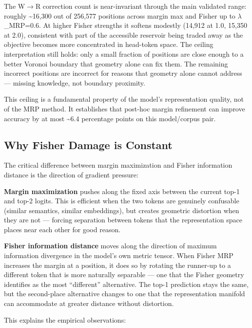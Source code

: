 \documentclass[
  11pt,
]{article}
\begin{document}
The W$\rightarrow$R correction count is near-invariant through the main validated
range: roughly \textasciitilde16,300 out of 256,577 positions across
margin max and Fisher up to $\lambda$\_MRP=0.6. At higher Fisher strengths it
softens modestly (14,912 at 1.0, 15,350 at 2.0), consistent with part of
the accessible reservoir being traded away as the objective becomes more
concentrated in head-token space. The ceiling interpretation still
holds: only a small fraction of positions are close enough to a better
Voronoi boundary that geometry alone can fix them. The remaining
incorrect positions are incorrect for reasons that geometry alone cannot
address --- missing knowledge, not boundary proximity.

This ceiling is a fundamental property of the model's representation
quality, not of the MRP method. It establishes that post-hoc margin
refinement can improve accuracy by at most \textasciitilde6.4 percentage
points on this model/corpus pair.

\hypertarget{why-fisher-damage-is-constant}{%
\subsection{Why Fisher Damage is
Constant}\label{why-fisher-damage-is-constant}}

The critical difference between margin maximization and Fisher
information distance is the direction of gradient pressure:

\textbf{Margin maximization} pushes along the fixed axis between the
current top-1 and top-2 logits. This is efficient when the two tokens
are genuinely confusable (similar semantics, similar embeddings), but
creates geometric distortion when they are not --- forcing separation
between tokens that the representation space places near each other for
good reason.

\textbf{Fisher information distance} moves along the direction of
maximum information divergence in the model's own metric tensor. When
Fisher MRP increases the margin at a position, it does so by rotating
the runner-up to a different token that is more naturally separable ---
one that the Fisher geometry identifies as the most ``different''
alternative. The top-1 prediction stays the same, but the second-place
alternative changes to one that the representation manifold can
accommodate at greater distance without distortion.

This explains the empirical observations:
\end{document}
